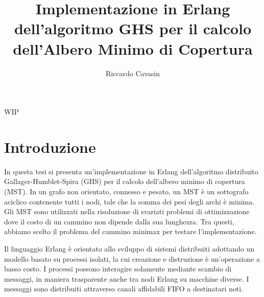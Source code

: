 \documentclass[target=bach,aauheader=,style=]{thud}
\title{Implementazione in Erlang dell'algoritmo GHS per il calcolo dell'Albero Minimo di Copertura}
\author{Riccardo Cavasin}
\begin{document}
\maketitle


\abstract
WIP

\tableofcontents



\mainmatter

\chapter{Introduzione}
In questa tesi si presenta un'implementazione in Erlang dell'algoritmo distribuito Gallager-Humblet-Spira (GHS) per il calcolo dell'albero minimo di copertura (MST). In un grafo non orientato, connesso e pesato, un MST è un sottografo aciclico contenente tutti i nodi, tale che la somma dei pesi degli archi è minima. Gli MST sono utilizzati nella risoluzione di svariati problemi di ottimizzazione dove il costo di un cammino non dipende dalla sua lunghezza. Tra questi, abbiamo scelto il problema del cammino minimax per testare l'implementazione.

Il linguaggio Erlang è orientato allo sviluppo di sistemi distribuiti adottando un modello basato su processi isolati, la cui creazione e distruzione è un'operazione a basso costo. I processi possono interagire solamente mediante scambio di messaggi, in maniera trasparente anche tra nodi Erlang su macchine diverse. I messaggi sono distribuiti attraverso canali affidabili FIFO a destinatari noti.
\end{document}
